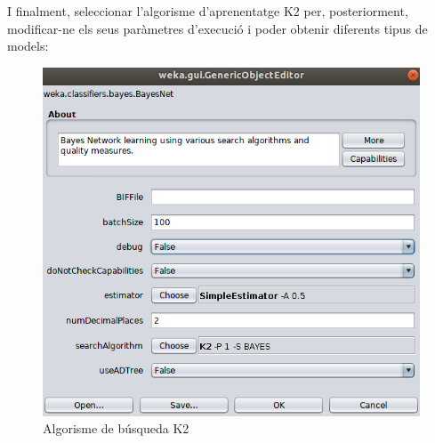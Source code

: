 \documentclass[11pt,a4paper]{article}
\begin{document}
\\\\
I finalment, seleccionar l'algorisme d'aprenentatge K2 per, posteriorment, modificar-ne els seus paràmetres d'execució i poder obtenir diferents tipus de models:\\
\begin{figure}[hbtp]
\centering
\includegraphics[scale=0.38]{Figures/3.png}
\caption{Algorisme de búsqueda K2}
\end{figure}

\newpage
\end{document}
